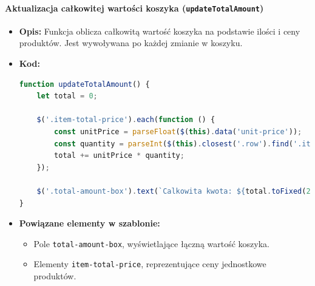 \documentclass[12pt,a4paper,oneside]{article}
\theoremstyle{definition}
\numberwithin{equation}{section}
\begin{document}
\paragraph{Aktualizacja całkowitej wartości koszyka (\texttt{updateTotalAmount})}
\begin{itemize}
    \item \textbf{Opis:}  
    Funkcja oblicza całkowitą wartość koszyka na podstawie ilości i ceny produktów. Jest wywoływana po każdej zmianie w koszyku.
    \item \textbf{Kod:}
\begin{lstlisting}[language=JavaScript, caption=Kod funkcji updateTotalAmount]
function updateTotalAmount() {
    let total = 0;

    $('.item-total-price').each(function () {
        const unitPrice = parseFloat($(this).data('unit-price'));
        const quantity = parseInt($(this).closest('.row').find('.item-quantity').val());
        total += unitPrice * quantity;
    });

    $('.total-amount-box').text(`Calkowita kwota: ${total.toFixed(2)} zl`);
}
\end{lstlisting}
    \item \textbf{Powiązane elementy w szablonie:}
    \begin{itemize}
        \item Pole \texttt{total-amount-box}, wyświetlające łączną wartość koszyka.
        \item Elementy \texttt{item-total-price}, reprezentujące ceny jednostkowe produktów.
    \end{itemize}
\end{itemize}
\end{document}
